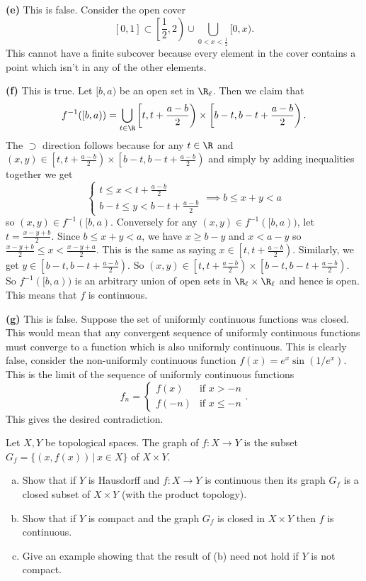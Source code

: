 \documentclass[11pt,letterpaper]{article}
\begin{document}
\begin{solution}
    \textbf{(e)} This is false. Consider the open cover
    \[
        [0,1]\subset\left[\frac{1}{2}, 2\right) \cup \bigcup_{0<x<\frac{1}{2}}[0,x)
    .\] 
    This cannot have a finite subcover because every element in the cover contains a point which isn't in any of the other elements.

    \textbf{(f)} This is true. Let $[b,a)$ be an open set in $\R_\ell$. Then we claim that 
    \[
        f^{-1}([b,a))=\bigcup_{t\in \R}\left[t, t+\frac{a-b}{2}\right)\times\left[b-t, b-t+\frac{a-b}{2}\right)
    .\]  
    The $\supset$ direction follows because for any $t\in \R$ and $(x,y)\in \left[t, t+\frac{a-b}{2}\right)\times\left[b-t, b-t+\frac{a-b}{2}\right)$ and simply by adding inequalities together we get
    \[
        \begin{cases}
            t\leq x<t+\frac{a-b}{2}\\
            b-t\leq y<b-t+\frac{a-b}{2}
        \end{cases}\implies b\leq x+y<a
    \]
    so $(x,y)\in f^{-1}([b,a)$. Conversely for any $(x,y)\in f^{-1}([b,a))$, let $t=\frac{x-y+b}{2}$. Since $b\leq x+y<a$, we have $x\geq b-y$ and $x < a-y$ so $\frac{x-y+b}{2}\leq x < \frac{x-y+a}{2}$. This is the same as saying $x\in \left[t, t+\frac{a-b}{2}\right)$. Similarly, we get $y\in \left[b-t, b-t+\frac{a-b}{2}\right)$. So $(x,y)\in \left[t, t+\frac{a-b}{2}\right)\times\left[b-t, b-t+\frac{a-b}{2}\right)$. So $f^{-1}([b,a))$ is an arbitrary union of open sets in $\R_\ell\times \R_\ell$ and hence is open. This means that $f$ is continuous.     

    \textbf{(g)} This is false. Suppose the set of uniformly continuous functions was closed. This would mean that any convergent sequence of uniformly continuous functions must converge to a function which is also uniformly continuous. This is clearly false, consider the non-uniformly continuous function $f(x)=e^x\sin(1 /e^x)$. This is the limit of the sequence of uniformly continuous functions
    \[
        f_{n}=\begin{cases}
            f(x)&\textrm{if }x>-n\\
            f(-n)&\textrm{if }x\leq -n
        \end{cases}
    .\]  
    This gives the desired contradiction.
\end{solution}

\pagebreak
\begin{problem}[6 points]
    Let $X,Y$ be topological spaces. The graph of $f:X\to Y$ is the subset $G_f=\{(x,f(x))\,|\,x\in X\}$ of $X\times Y$.
    \begin{enumerate}[(a)]
        \item Show that if $Y$ is Hausdorff and $f:X\to Y$ is continuous then its graph $G_f$ is a closed subset of $X\times Y$ (with the product topology). 
        \item Show that if $Y$ is compact and the graph $G_f$ is closed in $X\times Y$ then $f$ is continuous.
        \item Give an example showing that the result of (b) need not hold if $Y$ is not compact.
    \end{enumerate}
\end{problem}
\end{document}
